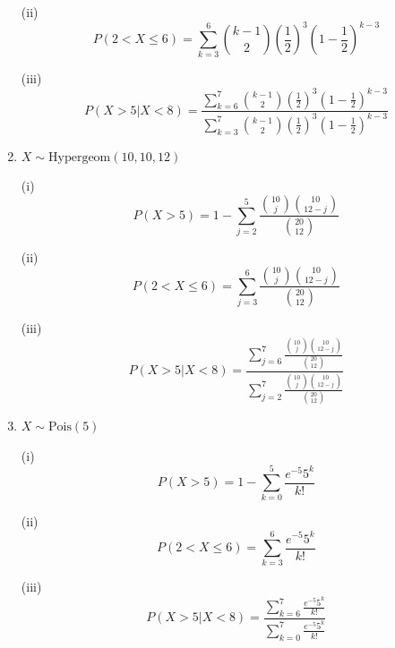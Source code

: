 \begin{problem}{7}
\begin{enumerate}
\indent (ii)
\begin{equation*}
P(2<X \le 6)  =\sum_{k=3}^6 \binom{k-1}{2}\left(\frac{1}{2}\right)^3\left(1-\frac{1}{2}\right)^{k-3}
\end{equation*}

\indent (iii)
\begin{equation*}
P(X>5|X<8)  = \frac{\sum_{k=6}^7 \binom{k-1}{2}\left(\frac{1}{2}\right)^3\left(1-\frac{1}{2}\right)^{k-3}}{\sum_{k=3}^7 \binom{k-1}{2}\left(\frac{1}{2}\right)^3\left(1-\frac{1}{2}\right)^{k-3}}
\end{equation*}

\item  $X \sim \mathrm{Hypergeom}(10, 10, 12)$

\indent (i)
\begin{equation*}
P(X>5)  = 1 - \sum_{j=2}^5 \frac{\binom{10}{j}\binom{10}{12-j} }{\binom{20}{12}}
\end{equation*}

\indent (ii)
\begin{equation*}
P(2<X \le 6)  =\sum_{j=3}^6 \frac{\binom{10}{j}\binom{10}{12-j} }{\binom{20}{12}}
\end{equation*}

\indent (iii)
\begin{equation*}
P(X>5|X<8)  = \frac{\sum_{j=6}^7 \frac{\binom{10}{j}\binom{10}{12-j} }{\binom{20}{12}}}{\sum_{j=2}^7 \frac{\binom{10}{j}\binom{10}{12-j} }{\binom{20}{12}}}
\end{equation*}

\item  $X \sim \mathrm{Pois}(5)$

\indent (i)
\begin{equation*}
P(X>5)  = 1 - \sum_{k=0}^5 \frac{e^{-5}5^{k}}{k!}
\end{equation*}

\indent (ii)
\begin{equation*}
P(2<X \le 6)  =\sum_{k=3}^6 \frac{e^{-5}5^{k}}{k!}
\end{equation*}

\indent (iii)
\begin{equation*}
P(X>5|X<8)  = \frac{\sum_{k=6}^7 \frac{e^{-5}5^{k}}{k!}}{\sum_{k=0}^7 \frac{e^{-5}5^{k}}{k!}}
\end{equation*}

\end{enumerate}

\end{problem}

